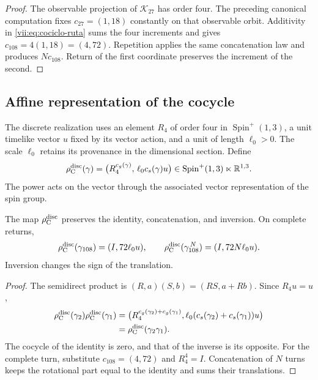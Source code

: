 \begin{proof}
The observable projection of \(\mathcal K_{27}\) has order four.
The preceding canonical computation fixes \(c_{27}=(1,18)\) constantly
on that observable orbit. Additivity in
\eqref{vii:eq:cociclo-ruta} sums the four increments and gives
\(c_{108}=4(1,18)=(4,72)\).
Repetition applies the same concatenation law and produces
\(Nc_{108}\). Return of the first coordinate preserves the
increment of the second.
\end{proof}

\pagebreak %
\subsection{Affine representation of the cocycle}
\label{vii:subsec:representacion-afin-cociclo}

The discrete realization uses an element \(R_4\) of order four in
\(\operatorname{Spin}^+(1,3)\), a unit timelike vector \(u\)
fixed by its vector action, and a unit of length \(\ell_0>0\).
The scale \(\ell_0\) retains its provenance in the dimensional section.
Define
\begin{equation}
 \rho_{\rm C}^{\rm disc}(\gamma)=
 \bigl(R_4^{c_g(\gamma)},\,\ell_0c_s(\gamma)u\bigr)
 \in\operatorname{Spin}^+(1,3)\ltimes\mathbb R^{1,3}.
 \label{vii:eq:representacion-discreta-memoria}
\end{equation}
The power acts on the vector through the associated vector
representation of the spin group.

\begin{theorem}
\label{vii:thm:traslacion-memoria}
The map \(\rho_{\rm C}^{\rm disc}\) preserves the identity,
concatenation, and inversion. On complete returns,
\begin{equation}
 \rho_{\rm C}^{\rm disc}(\gamma_{108})=(I,72\ell_0u),\qquad
 \rho_{\rm C}^{\rm disc}(\gamma_{108}^{\,N})=(I,72N\ell_0u).
 \label{vii:eq:traslacion-retorno-108}
\end{equation}
Inversion changes the sign of the translation.
\end{theorem}

\begin{proof}
The semidirect product is
\((R,a)(S,b)=(RS,a+Rb)\). Since \(R_4u=u\),
\[
\begin{split}
 \rho_{\rm C}^{\rm disc}(\gamma_2)
 \rho_{\rm C}^{\rm disc}(\gamma_1)
 &=
 \bigl(R_4^{c_g(\gamma_2)+c_g(\gamma_1)},
 \ell_0(c_s(\gamma_2)+c_s(\gamma_1))u\bigr)\\
 &=\rho_{\rm C}^{\rm disc}(\gamma_2\gamma_1).
\end{split}
\]
The cocycle of the identity is zero, and that of the inverse is its opposite.
For the complete turn, substitute \(c_{108}=(4,72)\) and
\(R_4^4=I\). Concatenation of \(N\) turns keeps the rotational
part equal to the identity and sums their translations.
\end{proof}

